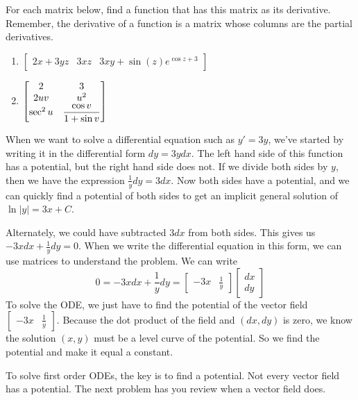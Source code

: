 \begin{problem}
 For each matrix below, find a function that has this matrix as its derivative.  Remember, the derivative of a function is a matrix whose columns are the partial derivatives. 
\begin{enumerate}
 \item 
$
\begin{bmatrix}
 2x+3yz & 3xz & 3xy + \sin(z)e^{\cos z +3}
\end{bmatrix}
$
\item 
$\displaystyle\begin{bmatrix}
 2 & 3\\
 2uv&u^2 \\
 \sec^2u&\displaystyle\frac{\cos v}{1+\sin v}\\
\end{bmatrix}$

\end{enumerate}
\end{problem}




When we want to solve a differential equation such as $y'=3y$, we've started by writing it in the differential form $dy = 3ydx$.  The left hand side of this function has a potential, but the right hand side does not. If we divide both sides by $y$, then we have the expression $\frac{1}{y}dy = 3dx$.  Now both sides have a potential, and we can quickly find a potential of both sides to get an implicit general solution of $\ln |y|=3x+C$.  

Alternately, we could have subtracted $3dx$ from both sides.  This gives us $-3x dx+\frac{1}{y}dy=0$. When we write the differential equation in this form, we can use matrices to understand the problem. We can write
$$
 0=-3x dx+\frac{1}{y}dy = \begin{bmatrix}-3x&\frac{1}{y}\end{bmatrix}\begin{bmatrix}dx\\dy\end{bmatrix}
$$
To solve the ODE, we just have to find the potential of the vector field $\begin{bmatrix}-3x&\frac{1}{y}\end{bmatrix}$.  Because the dot product of the field and $(dx,dy)$ is zero, we know the solution $(x,y)$ must be a level curve of the potential. So we find the potential and make it equal a constant.

To solve first order ODEs, the key is to find a potential.  Not every vector field has a potential. The next problem has you review when a vector field does.  






